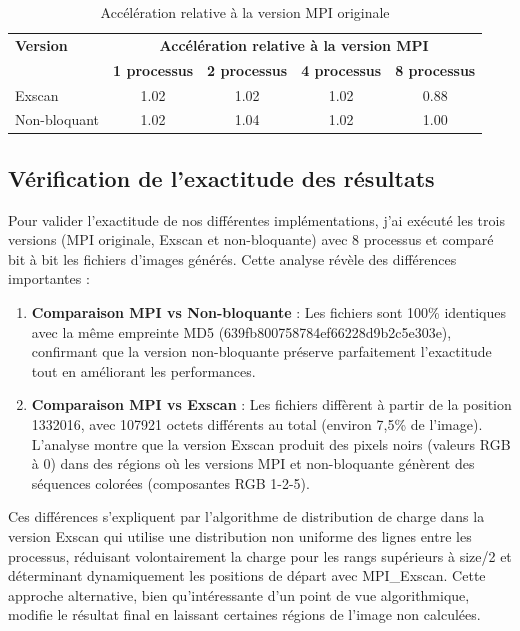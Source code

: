 \documentclass[a4paper,11pt]{article}
\begin{document}
\begin{table}[H]
\centering
\begin{tabular}{@{}lcccc@{}}
\toprule
\textbf{Version} & \multicolumn{4}{c}{\textbf{Accélération relative à la version MPI}} \\
 & \textbf{1 processus} & \textbf{2 processus} & \textbf{4 processus} & \textbf{8 processus} \\
\midrule
Exscan & 1.02 & 1.02 & 1.02 & 0.88 \\
Non-bloquant & 1.02 & 1.04 & 1.02 & 1.00 \\
\bottomrule
\end{tabular}
\caption{Accélération relative à la version MPI originale}
\label{tab:speedups}
\end{table}

\subsection{Vérification de l'exactitude des résultats}

Pour valider l'exactitude de nos différentes implémentations, j'ai exécuté les trois versions (MPI originale, Exscan et non-bloquante) avec 8 processus et comparé bit à bit les fichiers d'images générés. Cette analyse révèle des différences importantes :

\begin{enumerate}
  \item \textbf{Comparaison MPI vs Non-bloquante} : Les fichiers sont 100\% identiques avec la même empreinte MD5 (639fb800758784ef66228d9b2c5e303e), confirmant que la version non-bloquante préserve parfaitement l'exactitude tout en améliorant les performances.
  
  \item \textbf{Comparaison MPI vs Exscan} : Les fichiers diffèrent à partir de la position 1332016, avec 107921 octets différents au total (environ 7,5\% de l'image). L'analyse montre que la version Exscan produit des pixels noirs (valeurs RGB à 0) dans des régions où les versions MPI et non-bloquante génèrent des séquences colorées (composantes RGB 1-2-5).
  

\end{enumerate}

Ces différences s'expliquent par l'algorithme de distribution de charge dans la version Exscan qui utilise une distribution non uniforme des lignes entre les processus, réduisant volontairement la charge pour les rangs supérieurs à size/2 et déterminant dynamiquement les positions de départ avec MPI\_Exscan. Cette approche alternative, bien qu'intéressante d'un point de vue algorithmique, modifie le résultat final en laissant certaines régions de l'image non calculées.
\end{document}
